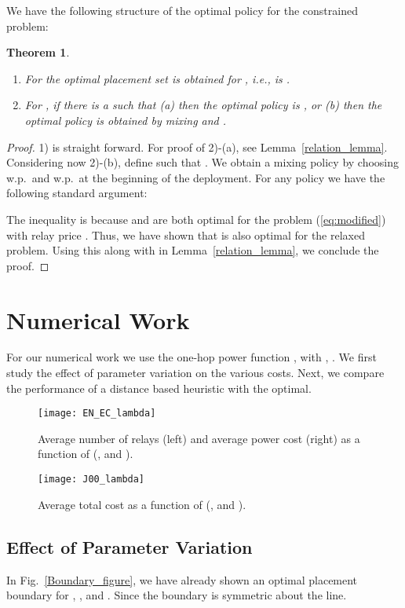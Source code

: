 \documentclass[conference]{IEEEtran}
\newtheorem{theorem}{Theorem}
\begin{document}
We have the following structure of the optimal policy for the constrained problem:
\begin{theorem}
\label{constrained_solution_theorem}
\begin{enumerate}
	\item For  the optimal placement set is obtained for ,
 i.e., is .
	 \item For , if there is a  such that (a) 
 then the optimal policy is , or 
(b)  then the optimal policy is obtained by 
mixing  and .
\end{enumerate}
\end{theorem}
\begin{proof}
  1) is straight forward. For proof of 2)-(a), see
  Lemma~\ref{relation_lemma}. Considering now 2)-(b), define
   such that
  .  We obtain
  a mixing policy  by choosing  w.p.\
   and  w.p.\  at the beginning of the
  deployment. For any policy  we have the following standard
  argument:

The inequality is because  and  are both optimal for the 
problem (\ref{eq:modified}) with relay price .
Thus, we have shown that  is also optimal for the relaxed problem. Using this along 
with  in Lemma~\ref{relation_lemma}, we conclude the proof.
\end{proof}


\section{Numerical Work}
\label{numerical_work_section}
For our numerical work we use the one-hop power function
, with , .
 We first study the effect of parameter variation
on the various costs. Next, we compare the performance of 
a distance based heuristic with the optimal.

\begin{figure}[t!]
\centering
\texttt{[image: EN\_EC\_lambda]}
\caption{Average number of relays  (left) and average power cost  (right) as a function of  (,  and ).}
\label{EN_EC_lambda_figure}
\end{figure}

\begin{figure}[t]
\centering
\texttt{[image: J00\_lambda]}
\caption{Average total cost  as a function of  (,  and ).}
\label{J00_lambda_figure}
\end{figure}




\subsection{Effect of Parameter Variation}
In Fig.~\ref{Boundary_figure}, we have already shown an optimal placement
boundary for , , and . Since  the
boundary is symmetric about the  line.
\end{document}
